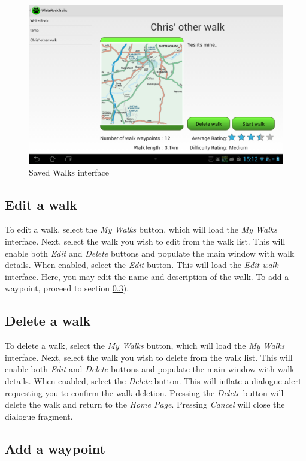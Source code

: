 \documentclass[11pt,a4paper]{report}
\begin{document}
\begin{figure}[H]
\centering
\includegraphics[width=0.8\linewidth]{./img/chris/saved_walks}
\caption{Saved Walks interface}
\label{fig:saved_walks}
\end{figure}

\subsection{Edit a walk}
\label{sec:edit_a_walk}

To edit a walk, select the \emph{My Walks} button, which will load the \emph{My Walks} interface. Next, select the walk you wish to edit from the walk list. This will enable both \emph{Edit} and \emph{Delete} buttons and populate the main window with walk details. When enabled, select the \emph{Edit}
button. This will load the \emph{Edit walk} interface. Here, you may edit the name and description of the walk. To add a waypoint, proceed to section \ref{sec:add_a_waypoint}).

\subsection{Delete a walk}
\label{sec:delete_a_walk}

To delete a walk, select the \emph{My Walks} button, which will load the \emph{My Walks} interface. Next, select the walk you wish to delete from the walk list. This will enable both \emph{Edit} and \emph{Delete} buttons and populate the main window with walk details. When enabled, select the \emph{Delete} button. This will inflate a dialogue alert requesting you to confirm the walk deletion. Pressing the \emph{Delete} button will delete the walk and return to the \emph{Home Page}. Pressing \emph{Cancel} will close the dialogue fragment.

\subsection{Add a waypoint}
\label{sec:add_a_waypoint}
\end{document}
